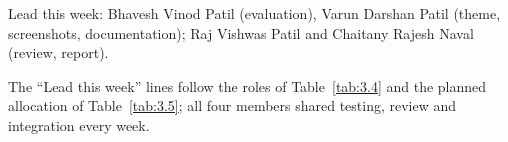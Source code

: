 Lead this week: Bhavesh Vinod Patil (evaluation), Varun Darshan Patil (theme, screenshots, documentation); Raj Vishwas Patil and Chaitany Rajesh Naval (review, report).

The ``Lead this week'' lines follow the roles of Table~\ref{tab:3.4} and the planned allocation of Table~\ref{tab:3.5}; all four members shared testing, review and integration every week.
